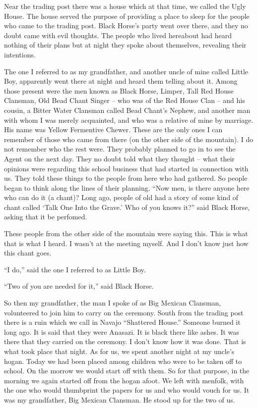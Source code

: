 Near the trading post there was a house which at that time, we called the Ugly House. The house served the purpose of providing a place to sleep for the people who came to the trading post. Black Horse's party went over there, and they no doubt came with evil thoughts. The people who lived hereabout had heard nothing of their plans but at night they spoke about themselves, revealing their intentions.

The one I referred to as my grandfather, and another uncle of mine called Little Boy, apparently went there at night and heard them telling about it. Among those present were the men known as Black Horse, Limper, Tall Red House Clansman, Old Bead Chant Singer -- who was of the Red House Clan -- and his cousin, a Bitter Water Clansman called Bead Chant's Nephew, and another man with whom I was merely acquainted, and who was a relative of mine by marriage. His name was Yellow Fermentive Chewer. These are the only ones I can remember of those who came from there (on the other side of the mountain). I do not remember who the rest were. They probably planned to go in to see the Agent on the next day. They no doubt told what they thought -- what their opinions were regarding this school business that had started in connection with us. They told these things to the people from here who had gathered. So people began to think along the lines of their planning. ``Now men, is there anyone here who can do it (a chant)? Long ago, people of old had a story of some kind of chant called `Talk One Into the Grave.' Who of you knows it?'' said Black Horse, asking that it be perfomed. 

These people from the other side of the mountain were saying this. This is what that is what I heard. I wasn't at the meeting myself. And I don't know just how this chant goes.

``I do,'' said the one I referred to as Little Boy.

``Two of you are needed for it,'' said Black Horse.

So then my grandfather, the man I spoke of as Big Mexican Clansman, volunteered to join him to carry on the ceremony. South from the trading post there is a ruin which we call in Navajo ``Shattered House.'' Someone burned it long ago. It is said that they were Anasazi. It is black there like ashes. It was there that they carried on the ceremony. I don't know how it was done. That is what took place that night.
As for us, we spent another night at my uncle's hogan. Today we had been placed among children who were to be taken off to school. On the morrow we would start off with them. So for that purpose, in the morning we again started off from the hogan afoot. We left with menfolk, with the one who would thumbprint the papers for us and who would vouch for us. It was my grandfather, Big Mexican Clansman. He stood up for the two of us.

